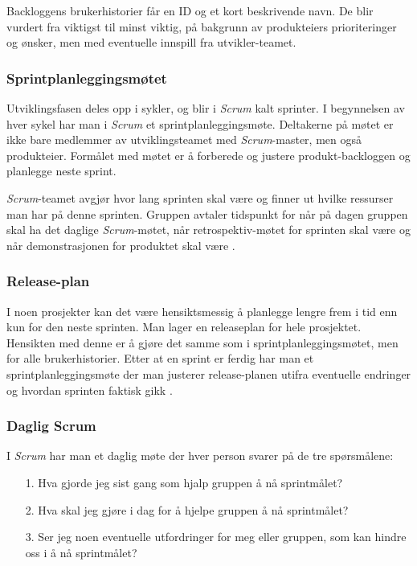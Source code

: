\documentclass[12pt,a4paper,norsk]{article}
\begin{document}
    Backloggens brukerhistorier får en ID og et kort beskrivende navn. De blir vurdert fra viktigst til minst viktig, på bakgrunn av produkteiers prioriteringer og ønsker, men med eventuelle innspill fra utvikler-teamet.
  \subsubsection{Sprintplanleggingsmøtet}
  Utviklingsfasen deles opp i sykler, og blir i \textit{Scrum} kalt sprinter. I begynnelsen av hver sykel har man i \textit{Scrum} et sprintplanleggingsmøte. Deltakerne på møtet er ikke bare medlemmer av utviklingsteamet med \textit{Scrum}-master, men også produkteier. Formålet med møtet er å forberede og justere produkt-backloggen og planlegge neste sprint.

    \textit{Scrum}-teamet avgjør hvor lang sprinten skal være og finner ut hvilke ressurser man har på denne sprinten. Gruppen avtaler tidspunkt for når på dagen gruppen skal ha det daglige \textit{Scrum}-møtet, når retrospektiv-møtet for sprinten skal være og når demonstrasjonen for produktet skal være \cite[side 16]{kniberg}.

  \subsubsection{Release-plan}
  I noen prosjekter kan det være hensiktsmessig å planlegge lengre frem i tid enn kun for den neste sprinten. Man lager en releaseplan for hele prosjektet. Hensikten med denne er å gjøre det samme som i sprintplanleggingsmøtet, men for alle brukerhistorier. Etter at en sprint er ferdig har man et sprintplanleggingsmøte der man justerer release-planen utifra eventuelle endringer og hvordan sprinten faktisk gikk \cite[side 95 - 101]{kniberg}.

  \subsubsection{Daglig Scrum}
  I \textit{Scrum} har man et daglig møte der hver person svarer på de tre spørsmålene:

  \begin{itemize}
        \item[1.] Hva gjorde jeg sist gang som hjalp gruppen å nå sprintmålet?
        \item[2.] Hva skal jeg gjøre i dag for å hjelpe gruppen å nå sprintmålet?
        \item[3.] Ser jeg noen eventuelle utfordringer for meg eller gruppen, som kan hindre oss i å nå sprintmålet?
    \end{itemize}
\end{document}
